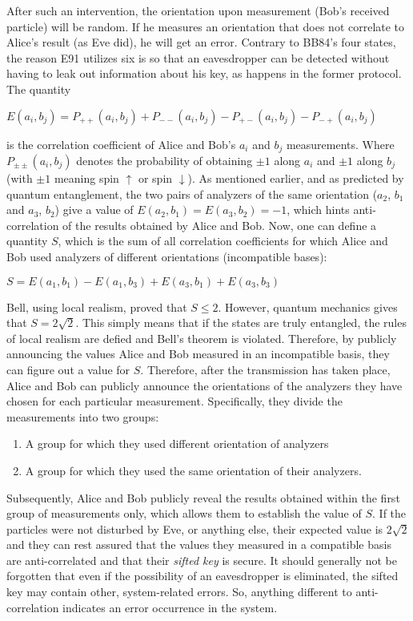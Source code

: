 After such an intervention, the orientation upon measurement (Bob's received particle) will be
random. If he measures an orientation that does not correlate to Alice's result (as Eve did), he will get an error.
Contrary to BB84's four states, the reason E91 utilizes six is so that an eavesdropper can be
detected without having to leak out information about his key, as happens in the former protocol.\\
The quantity
\begin{center}
  $E(a_{i}, b_{j}) = P_{++}(a_{i}, b_{j}) + P_{--}(a_{i}, b_{j}) - P_{+-}(a_{i}, b_{j}) - P_{-+}(a_{i}, b_{j})$
\end{center}
is the correlation coefficient of Alice and Bob's $a_{i}$ and $b_{j}$ measurements.
Where $P_{\pm\pm}(a_{i}, b_{j})$ denotes the probability of obtaining $\pm1$ along $a_{i}$ and $\pm1$ along $b_{j}$
(with $\pm1$ meaning spin $\bm{\uparrow}$ or spin $\bm{\downarrow}$). As mentioned earlier, and as predicted by quantum entanglement, 
the two pairs of analyzers of the same orientation ($a_{2}$, $b_{1}$ and $a_{3}$, $b_{2}$) give a value of
$E(a_{2}, b_{1}) = E(a_{3}, b_{2}) = -1$, which hints anti-correlation of the results obtained by Alice and Bob.
Now, one can define a quantity $S$, which is the sum of all correlation coefficients for which Alice and Bob used analyzers
of different orientations (incompatible bases):
\begin{center}
$S = E(a_{1}, b_{1}) - E(a_{1}, b_{3}) + E(a_{3}, b_{1}) + E(a_{3}, b_{3})$
\end{center}
Bell, using local realism, proved that $S\leq2$. However, quantum mechanics gives that $S = 2\sqrt{2}$.
This simply means that if the states are truly entangled, the rules of local realism are
defied and Bell's theorem is violated. Therefore, by publicly announcing the values Alice
and Bob measured in an incompatible basis, they can figure out a value for $S$. Therefore,
after the transmission has taken place, Alice and Bob can publicly announce the
orientations of the analyzers they have chosen for each particular measurement.
Specifically, they divide the measurements into two groups:
\begin{enumerate}
	\item A group for which they used different orientation of analyzers
	\item A group for which they used the same orientation of their analyzers.
\end{enumerate}
Subsequently, Alice and Bob publicly reveal the results obtained within the first group of measurements only, 
which allows them to establish the value of $S$. If the particles were not disturbed by Eve, or anything else, 
their expected value is $2\sqrt{2}$ and they can rest assured
that the values they measured in a compatible basis are anti-correlated and that their
{\it sifted key} is secure. It should generally not be forgotten that even if the possibility of an
eavesdropper is eliminated, the sifted key may contain other, system-related errors.
So, anything different to anti-correlation indicates an error occurrence in the system. 


